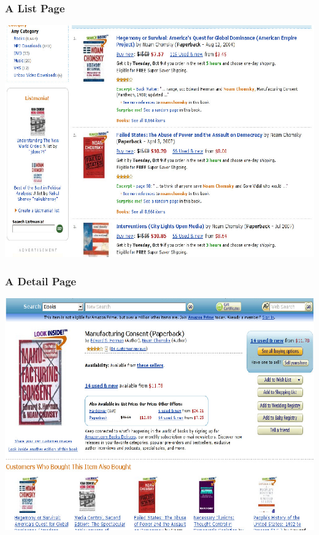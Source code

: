 \documentclass[svgnames]{beamer}
\begin{document}

\begin{frame} \frametitle{A List Page}

  \centering
  \includegraphics[width=\linewidth]{example1}
  
\end{frame}


\begin{frame} \frametitle{A Detail Page}

  \centering
  \includegraphics[width=\linewidth]{example2}
  
\end{frame}
\end{document}
